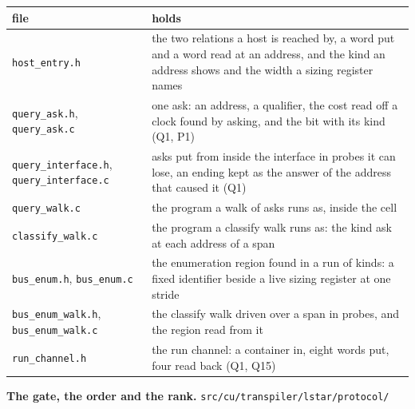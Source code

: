 {\small
\setlength{\tabcolsep}{6pt}
\begin{longtable}{>{\RaggedRight\arraybackslash}p{}>{\RaggedRight\arraybackslash}p{}}
\toprule
file & holds \\
\midrule
\endhead
\texttt{host\_\allowbreak{}entry.\allowbreak{}h} & the two relations a host is reached by, a word put and a word read at an address, and the kind an address shows and the width a sizing register names \\
\texttt{query\_\allowbreak{}ask.\allowbreak{}h}, \texttt{query\_\allowbreak{}ask.\allowbreak{}c} & one ask: an address, a qualifier, the cost read off a clock found by asking, and the bit with its kind (Q1, P1) \\
\texttt{query\_\allowbreak{}interface.\allowbreak{}h}, \texttt{query\_\allowbreak{}interface.\allowbreak{}c} & asks put from inside the interface in probes it can lose, an ending kept as the answer of the address that caused it (Q1) \\
\texttt{query\_\allowbreak{}walk.\allowbreak{}c} & the program a walk of asks runs as, inside the cell \\
\texttt{classify\_\allowbreak{}walk.\allowbreak{}c} & the program a classify walk runs as: the kind ask at each address of a span \\
\texttt{bus\_\allowbreak{}enum.\allowbreak{}h}, \texttt{bus\_\allowbreak{}enum.\allowbreak{}c} & the enumeration region found in a run of kinds: a fixed identifier beside a live sizing register at one stride \\
\texttt{bus\_\allowbreak{}enum\_\allowbreak{}walk.\allowbreak{}h}, \texttt{bus\_\allowbreak{}enum\_\allowbreak{}walk.\allowbreak{}c} & the classify walk driven over a span in probes, and the region read from it \\
\texttt{run\_\allowbreak{}channel.\allowbreak{}h} & the run channel: a container in, eight words put, four read back (Q1, Q15) \\
\bottomrule
\end{longtable}
}

\textbf{The gate, the order and the rank.} \texttt{src/\allowbreak{}cu/\allowbreak{}transpiler/\allowbreak{}lstar/\allowbreak{}protocol/\allowbreak{}}

